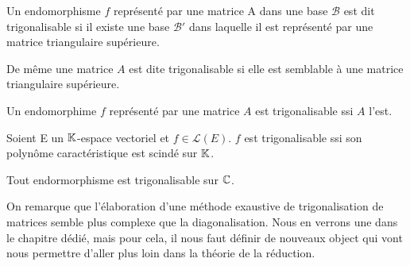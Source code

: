 
\begin{definition}[Trigonalisation]
    Un endomorphisme $f$ représenté par une matrice A dans une base $\mathcal{B}$ est dit trigonalisable si 
    il existe une base $\mathcal{B}'$ dans laquelle il est représenté par une matrice triangulaire supérieure. 

    \vspace{0.3cm}

    De même une matrice $A$ est dite trigonalisable si elle est semblable à une matrice triangulaire supérieure. 
\end{definition}

\begin{proposition}
    Un endomorphime $f$ représenté par une matrice $A$ est trigonalisable ssi $A$ l'est. 
\end{proposition}


\begin{criteria}
    Soient E un $\mathbb{K}$-espace vectoriel et $f \in \mathcal{L}(E)$. $f$ est trigonalisable ssi son polynôme caractéristique est scindé sur $\mathbb{K}$. 
\end{criteria}

\begin{corollary}[La puissance de $\C$]
    Tout endormorphisme est trigonalisable sur $\C$. 
\end{corollary}

On remarque que l'élaboration d'une méthode exaustive de trigonalisation de matrices semble plus complexe que la diagonalisation. 
Nous en verrons une dans le chapitre dédié, mais pour cela, il nous faut définir de nouveaux object qui vont nous permettre d'aller plus loin dans la théorie de la réduction. 

